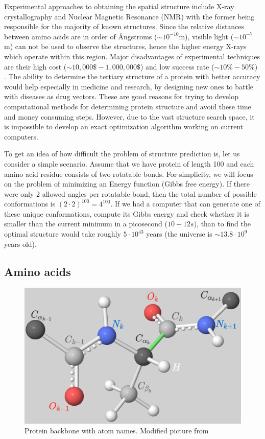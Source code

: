 Experimental approaches to obtaining the spatial structure include X-ray crystallography and Nuclear Magnetic Resonance (NMR) with the former being responsible for the majority of known structures. 
Since the relative distances between amino acids are in order of \AA ngstroms ($\sim10^{-10}$m), visible light ($\sim10^{-7}$m) can not be used to observe the structures, hence the higher energy X-rays which operate within this region. 
Major disadvantages of experimental techniques are their high cost ($\sim 10,000\mathdollar-1,000,000\mathdollar$) and low success rate ($\sim 10\%-50\%$) \cite{protcost}.
The ability to determine the tertiary structure of a protein with better accuracy would help especially in medicine and research, by designing new ones to battle with diseases as drug vectors.
These are good reasons for trying to develop computational methods for determining protein structure and avoid these time and money consuming steps.
However, due to the vast structure search space, it is impossible to develop an exact optimization algorithm working on current computers.

To get an idea of how difficult the problem of structure prediction is, let us consider a simple scenario. 
Assume that we have protein of length 100 and each amino acid residue consists of two rotatable bonds. 
For simplicity, we will focus on the problem of minimizing an Energy function (Gibbs free energy).
If there were only 2 allowed angles per rotatable bond, then the total number of possible conformations is $(2\cdot2)^{100} = 4^{100}$. 
If we had a computer that can generate one of these unique conformations, compute its Gibbs energy and check whether it is smaller than the current minimum in a picosecond ($10-{12} s$), than to find the optimal structure would take roughly $5 \cdot 10^{43}$ years (the universe is $\sim 13.8\cdot10^9$ years old).

\subsection{Amino acids}

\begin{figure}
    \centering
    \includegraphics[scale=0.5]{imgs_tomas/backbone.png}
    \caption{Protein backbone with atom names. Modified picture from \cite{ramachandran}}
    \label{fig:backbone0}
\end{figure}

